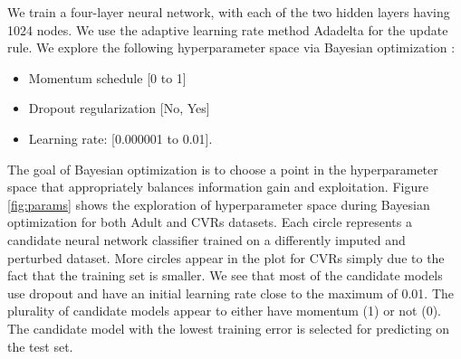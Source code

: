 \documentclass[10pt]{book}
\theoremstyle{definition}
\begin{document}
\par
{}

We train a four-layer neural network, with each of the two hidden layers having 1024 nodes. We use the adaptive learning rate method Adadelta \citep{zeiler2012} for the update rule. We explore the following hyperparameter space via Bayesian optimization \citep{snoek2012}:

\begin{itemize}
\item Momentum schedule [0 to 1]
\item Dropout regularization [No, Yes]
\item Learning rate: [0.000001 to 0.01].
\end{itemize}

The goal of Bayesian optimization is to choose a point in the hyperparameter space that appropriately balances information gain and exploitation. Figure \ref{fig:params} shows the exploration of hyperparameter space during Bayesian optimization for both Adult and CVRs datasets. Each circle represents a candidate neural network classifier trained on a differently imputed and perturbed dataset. More circles appear in the plot for CVRs simply due to the fact that the training set is smaller. We see that most of the candidate models use dropout and have an initial learning rate close to the maximum of 0.01. The plurality of candidate models appear to either have momentum (1) or not (0). The candidate model with the lowest training error is selected for predicting on the test set. 
\end{document}
